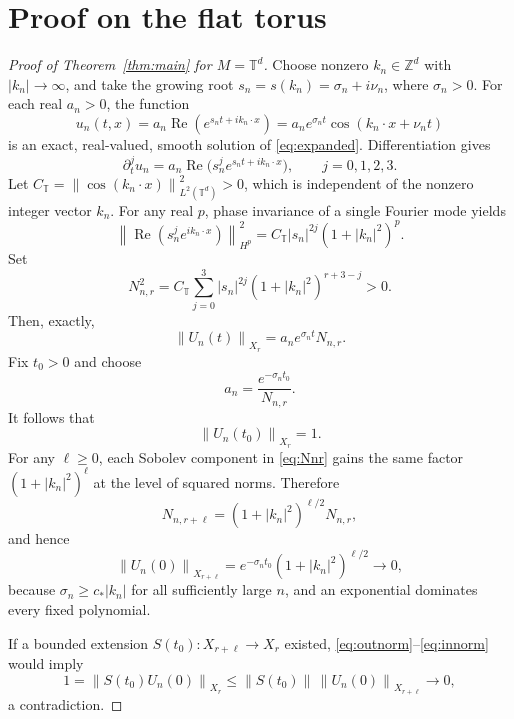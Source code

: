 \documentclass[11pt]{article}
\newcommand{\TT}{\mathbb{T}}
\newcommand{\norm}[1]{\left\lVert #1\right\rVert}
\begin{document}
\section{Proof on the flat torus}

\begin{proof}[Proof of Theorem~\ref{thm:main} for \(M=\TT^d\)]
Choose nonzero \(k_n\in\mathbb{Z}^d\) with \(|k_n|\to\infty\), and take the growing root \(s_n=s(k_n)=\sigma_n+i\nu_n\), where \(\sigma_n>0\). For each real \(a_n>0\), the function
\begin{equation}\label{eq:torus-solution}
  u_n(t,x)=a_n\operatorname{Re}(e^{s_nt+ik_n\cdot x})
       =a_ne^{\sigma_nt}\cos(k_n\cdot x+\nu_nt)
\end{equation}
is an exact, real-valued, smooth solution of \eqref{eq:expanded}. Differentiation gives
\[
  \partial_t^j u_n
    =a_n\operatorname{Re}\bigl(s_n^j e^{s_nt+ik_n\cdot x}\bigr),
  \qquad j=0,1,2,3.
\]
Let \(C_{\TT}=\norm{\cos(k_n\cdot x)}_{L^2(\TT^d)}^2>0\), which is independent of the nonzero integer vector \(k_n\). For any real \(p\), phase invariance of a single Fourier mode yields
\[
 \norm{\operatorname{Re}(s_n^j e^{ik_n\cdot x})}_{H^p}^2
  =C_{\TT}|s_n|^{2j}(1+|k_n|^2)^p.
\]
Set
\begin{equation}\label{eq:Nnr}
  N_{n,r}^2=C_{\TT}\sum_{j=0}^3
   |s_n|^{2j}(1+|k_n|^2)^{r+3-j}>0.
\end{equation}
Then, exactly,
\begin{equation}\label{eq:norm-at-t}
  \norm{U_n(t)}_{X_r}=a_ne^{\sigma_nt}N_{n,r}.
\end{equation}
Fix \(t_0>0\) and choose
\[
  a_n=\frac{e^{-\sigma_nt_0}}{N_{n,r}}.
\]
It follows that
\begin{equation}\label{eq:outnorm}
  \norm{U_n(t_0)}_{X_r}=1.
\end{equation}
For any \(\ell\ge0\), each Sobolev component in \eqref{eq:Nnr} gains the same factor \((1+|k_n|^2)^\ell\) at the level of squared norms. Therefore
\[
  N_{n,r+\ell}=(1+|k_n|^2)^{\ell/2}N_{n,r},
\]
and hence
\begin{equation}\label{eq:innorm}
  \norm{U_n(0)}_{X_{r+\ell}}
    =e^{-\sigma_nt_0}(1+|k_n|^2)^{\ell/2}
    \longrightarrow0,
\end{equation}
because \(\sigma_n\ge c_*|k_n|\) for all sufficiently large \(n\), and an exponential dominates every fixed polynomial.

If a bounded extension \(S(t_0):X_{r+\ell}\to X_r\) existed, \eqref{eq:outnorm}--\eqref{eq:innorm} would imply
\[
  1=\norm{S(t_0)U_n(0)}_{X_r}
    \le \norm{S(t_0)}\,\norm{U_n(0)}_{X_{r+\ell}}
    \longrightarrow0,
\]
a contradiction.
\end{proof}
\end{document}
